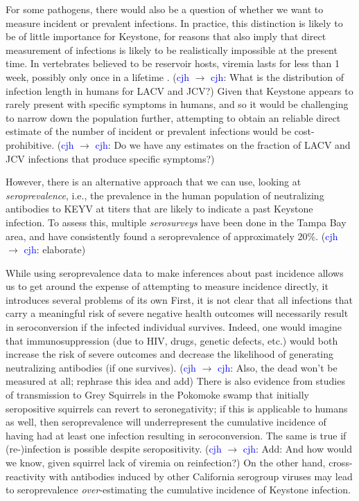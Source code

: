 \documentclass[12pt]{article}
\newcommand{\cjh}{\textcolor{blue}{cjh}}
\newcommand{\msg}[3]{(#1 $\rightarrow$ #2: #3)}
\newcommand{\mcc}[1]{\msg\cjh\cjh{#1}}
\begin{document}
        For some pathogens, there would also be a question of whether we want to measure incident or prevalent infections. In practice, this distinction is likely to be of little importance for Keystone, for reasons that also imply that direct measurement of infections is likely to be realistically impossible at the present time. In vertebrates believed to be reservoir hosts, viremia lasts for less than 1 week, possibly only once in a lifetime \cite{asdf}. \mcc{What is the distribution of infection length in humans for LACV and JCV?} Given that Keystone appears to rarely present with specific symptoms in humans, and so it would be challenging to narrow down the population further, attempting to obtain an reliable direct estimate of the number of incident or prevalent infections would be cost-prohibitive. \mcc{Do we have any estimates on the fraction of LACV and JCV infections that produce specific symptoms?}
        

        However, there is an alternative approach that we can use, looking at \textit{seroprevalence}, i.e., the prevalence in the human population of neutralizing antibodies to KEYV at titers that are likely to indicate a past Keystone infection. To assess this, multiple \textit{serosurveys} have been done in the Tampa Bay area\cite{asdf}, and have consistently found a seroprevalence of approximately 20\%\cite{asdf}. \mcc{elaborate}

        While using seroprevalence data to make inferences about past incidence allows us to get around the expense of attempting to measure incidence directly, it introduces several problems of its own First, it is not clear that all infections that carry a meaningful risk of severe negative health outcomes will necessarily result in seroconversion if the infected individual survives. Indeed, one would imagine that immunosuppression (due to HIV, drugs, genetic defects, etc.) would both increase the risk of severe outcomes and decrease the likelihood of generating neutralizing antibodies (if one survives). \mcc{Also, the dead won't be measured at all; rephrase this idea and add} There is also evidence from studies of transmission to Grey Squirrels in the Pokomoke swamp\cite{asdf} that initially seropositive squirrels can revert to seronegativity; if this is applicable to humans as well, then seroprevalence will underrepresent the cumulative incidence of having had at least one infection resulting in seroconversion. The same is true if (re-)infection is possible despite seropositivity. \mcc{Add: And how would we know, given squirrel lack of viremia on reinfection?} On the other hand, cross-reactivity with antibodies induced by other California serogroup viruses may lead to seroprevalence \textit{over}-estimating the cumulative incidence of Keystone infection.
\end{document}
